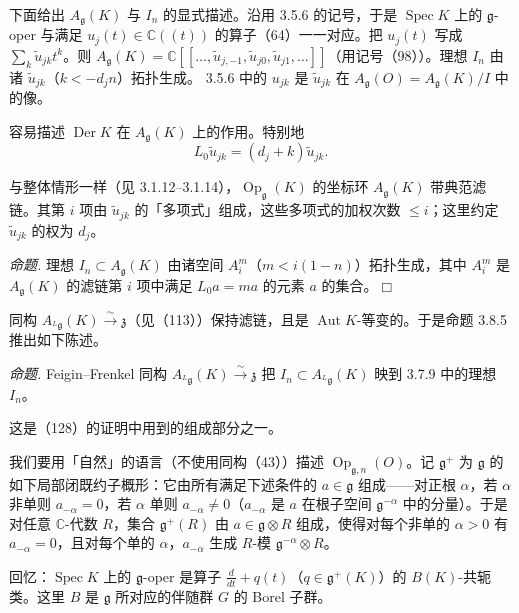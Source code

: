  下面给出 $A_{\mathfrak{g}}(K)$ 与 $I_{n}$ 的显式描述。沿用 3.5.6 的记号，于是 $\operatorname{Spec}K$ 上的 $\mathfrak{g}$-oper 与满足 $u_{j}(t)\in\mathbb{C}((t))$ 的算子（64）一一对应。把 $u_{j}(t)$ 写成 $\sum_{k}\tilde{u}_{jk}t^{k}$。则 $A_{\mathfrak{g}}(K)=\mathbb{C}[[\ldots,\tilde{u}_{j,-1},\tilde{u}_{j0},\tilde{u}_{j1},\ldots]]$（用记号（98））。理想 $I_{n}$ 由诸 $\tilde{u}_{jk}$（$k<-d_{j}n$）拓扑生成。 3.5.6 中的 $u_{jk}$ 是 $\tilde{u}_{jk}$ 在 $A_{\mathfrak{g}}(O)=A_{\mathfrak{g}}(K)/I$ 中的像。

容易描述 $\operatorname{Der}K$ 在 $A_{\mathfrak{g}}(K)$ 上的作用。特别地
\begin{equation}\tag{129}
  L_{0}\tilde{u}_{jk}=(d_{j}+k)\tilde{u}_{jk}.
\end{equation}

与整体情形一样（见 3.1.12--3.1.14），$\operatorname{Op}_{\mathfrak{g}}(K)$ 的坐标环 $A_{\mathfrak{g}}(K)$ 带典范滤链。其第 $i$ 项由 $\tilde{u}_{jk}$ 的「多项式」组成，这些多项式的加权次数 $\le i$；这里约定 $\tilde{u}_{jk}$ 的权为 $d_{j}$。

 \emph{命题.} 理想 $I_{n}\subset A_{\mathfrak{g}}(K)$ 由诸空间 $A_{i}^{m}$（$m<i(1-n)$）拓扑生成，其中 $A_{i}^{m}$ 是 $A_{\mathfrak{g}}(K)$ 的滤链第 $i$ 项中满足 $L_{0}a=ma$ 的元素 $a$ 的集合。\hfill$\Box$

同构 $A_{{}^{L}\mathfrak{g}}(K)\xrightarrow{\sim}\mathfrak{z}$（见（113））保持滤链，且是 $\operatorname{Aut}K$-等变的。于是命题 3.8.5 推出如下陈述。

 \emph{命题.} Feigin--Frenkel 同构 $A_{{}^{L}\mathfrak{g}}(K)\xrightarrow{\sim}\mathfrak{z}$ 把 $I_{n}\subset A_{{}^{L}\mathfrak{g}}(K)$ 映到 3.7.9 中的理想 $I_{n}$。

这是（128）的证明中用到的组成部分之一。

 我们要用「自然」的语言（不使用同构（43））描述 $\operatorname{Op}_{\mathfrak{g},n}(O)$。记 $\mathfrak{g}^{+}$ 为 $\mathfrak{g}$ 的如下局部闭既约子概形：它由所有满足下述条件的 $a\in\mathfrak{g}$ 组成——对正根 $\alpha$，若 $\alpha$ 非单则 $a_{-\alpha}=0$，若 $\alpha$ 单则 $a_{-\alpha}\ne 0$（$a_{-\alpha}$ 是 $a$ 在根子空间 $\mathfrak{g}^{-\alpha}$ 中的分量）。于是对任意 $\mathbb{C}$-代数 $R$，集合 $\mathfrak{g}^{+}(R)$ 由 $a\in\mathfrak{g}\otimes R$ 组成，使得对每个非单的 $\alpha>0$ 有 $a_{-\alpha}=0$，且对每个单的 $\alpha$，$a_{-\alpha}$ 生成 $R$-模 $\mathfrak{g}^{-\alpha}\otimes R$。

回忆：$\operatorname{Spec}K$ 上的 $\mathfrak{g}$-oper 是算子 $\frac{d}{dt}+q(t)$（$q\in\mathfrak{g}^{+}(K)$）的 $B(K)$-共轭类。这里 $B$ 是 $\mathfrak{g}$ 所对应的伴随群 $G$ 的 Borel 子群。


